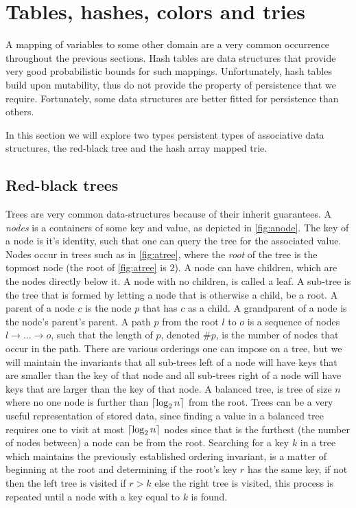 \section{Tables, hashes, colors and tries}
A mapping of variables to some other domain are a very common occurrence throughout the previous sections.
Hash tables are data structures that provide very good probabilistic bounds for such mappings.
Unfortunately, hash tables build upon mutability, thus do not provide the property of persistence that we require.
Fortunately, some data structures are better fitted for persistence than others.

In this section we will explore two types persistent types of associative data structures, the red-black tree and the hash array mapped trie.

\subsection{Red-black trees}
Trees are very common data-structures because of their inherit guarantees.
A \textit{nodes} is a containers of some key and value, as depicted in \autoref{fig:anode}.
The key of a node is it's identity, such that one can query the tree for the associated value.
Nodes occur in trees such as in \autoref{fig:atree}, where the \textit{root} of the tree is the topmost node (the root of \autoref{fig:atree} is $2$).
A node can have children, which are the nodes directly below it.
A node with no children, is called a leaf.
A sub-tree is the tree that is formed by letting a node that is otherwise a child, be a root.
A parent of a node $c$ is the node $p$ that has $c$ as a child.
A grandparent of a node is the node's parent's parent.
A path $p$ from the root $l$ to $o$ is a sequence of nodes $l \rightarrow \dots \rightarrow o$, such that the length of $p$, denoted $\#p$, is the number of nodes that occur in the path.
There are various orderings one can impose on a tree, but we will maintain the invariants that all sub-trees left of a node will have keys that are smaller than the key of that node and all sub-trees right of a node will have keys that are larger than the key of that node.
A balanced tree, is tree of size $n$ where no one node is further than $\lceil\log_2 n\rceil$ from the root.
Trees can be a very useful representation of stored data, since finding a value in a balanced tree requires one to visit at most $\lceil\log_2 n\rceil$ nodes since that is the furthest (the number of nodes between) a node can be from the root.
Searching for a key $k$ in a tree which maintains the previously established ordering invariant, is a matter of beginning at the root and determining if the root's key $r$ has the same key, if not then the left tree is visited if $r > k$ else the right tree is visited, this process is repeated until a node with a key equal to $k$ is found.
